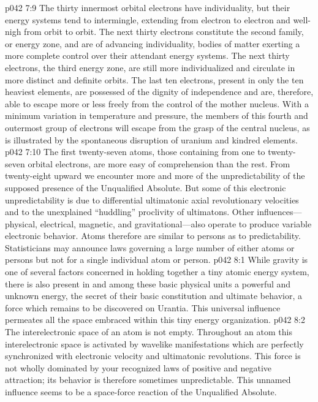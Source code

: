 \vs p042 7:9 The thirty innermost orbital electrons have individuality, but their energy systems tend to intermingle, extending from electron to electron and well\hyp{}nigh from orbit to orbit. The next thirty electrons constitute the second family, or energy zone, and are of advancing individuality, bodies of matter exerting a more complete control over their attendant energy systems. The next thirty electrons, the third energy zone, are still more individualized and circulate in more distinct and definite orbits. The last ten electrons, present in only the ten heaviest elements, are possessed of the dignity of independence and are, therefore, able to escape more or less freely from the control of the mother nucleus. With a minimum variation in temperature and pressure, the members of this fourth and outermost group of electrons will escape from the grasp of the central nucleus, as is illustrated by the spontaneous disruption of uranium and kindred elements.
\vs p042 7:10 The first twenty\hyp{}seven atoms, those containing from one to twenty\hyp{}seven orbital electrons, are more easy of comprehension than the rest. From twenty\hyp{}eight upward we encounter more and more of the unpredictability of the supposed presence of the Unqualified Absolute. But some of this electronic unpredictability is due to differential ultimatonic axial revolutionary velocities and to the unexplained “huddling” proclivity of ultimatons. Other influences---physical, electrical, magnetic, and gravitational---also operate to produce variable electronic behavior. Atoms therefore are similar to persons as to predictability. Statisticians may announce laws governing a large number of either atoms or persons but not for a single individual atom or person.
\vs p042 8:1 While gravity is one of several factors concerned in holding together a tiny atomic energy system, there is also present in and among these basic physical units a powerful and unknown energy, the secret of their basic constitution and ultimate behavior, a force which remains to be discovered on Urantia. This universal influence permeates all the space embraced within this tiny energy organization.
\vs p042 8:2 The interelectronic space of an atom is not empty. Throughout an atom this interelectronic space is activated by wavelike manifestations which are perfectly synchronized with electronic velocity and ultimatonic revolutions. This force is not wholly dominated by your recognized laws of positive and negative attraction; its behavior is therefore sometimes unpredictable. This unnamed influence seems to be a space\hyp{}force reaction of the Unqualified Absolute.
